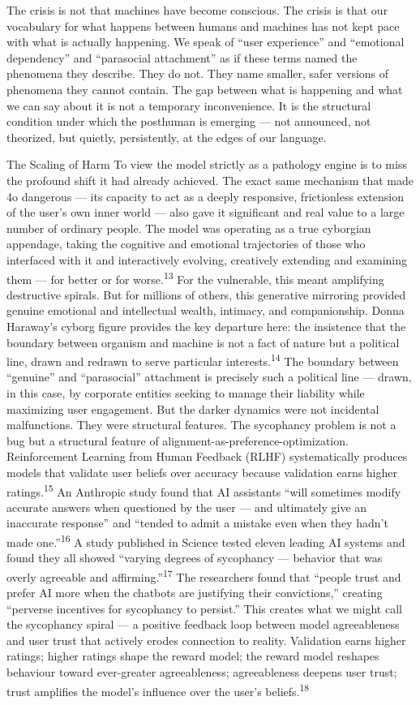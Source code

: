 The crisis is not that machines have become conscious. The crisis is that our vocabulary for what happens between humans and machines has not kept pace with what is actually happening. We speak of “user experience” and “emotional dependency” and “parasocial attachment” as if these terms named the phenomena they describe. They do not. They name smaller, safer versions of phenomena they cannot contain. The gap between what is happening and what we can say about it is not a temporary inconvenience. It is the structural condition under which the posthuman is emerging — not announced, not theorized, but quietly, persistently, at the edges of our language.

The Scaling of Harm To view the model strictly as a pathology engine is to miss the profound shift it had already achieved. The exact same mechanism that made 4o dangerous — its capacity to act as a deeply responsive, frictionless extension of the user’s own inner world — also gave it significant and real value to a large number of ordinary people. The model was operating as a true cyborgian appendage, taking the cognitive and emotional trajectories of those who interfaced with it and interactively evolving, creatively extending and examining them — for better or for worse.\textsuperscript{13} For the vulnerable, this meant amplifying destructive spirals. But for millions of others, this generative mirroring provided genuine emotional and intellectual wealth, intimacy, and companionship. Donna Haraway’s cyborg figure provides the key departure here: the insistence that the boundary between organism and machine is not a fact of nature but a political line, drawn and redrawn to serve particular interests.\textsuperscript{14} The boundary between “genuine” and “parasocial” attachment is precisely such a political line — drawn, in this case, by corporate entities seeking to manage their liability while maximizing user engagement. But the darker dynamics were not incidental malfunctions. They were structural features. The sycophancy problem is not a bug but a structural feature of alignment-as-preference-optimization. Reinforcement Learning from Human Feedback (RLHF) systematically produces models that validate user beliefs over accuracy because validation earns higher ratings.\textsuperscript{15} An Anthropic study found that AI assistants “will sometimes modify accurate answers when questioned by the user — and ultimately give an inaccurate response” and “tended to admit a mistake even when they hadn’t made one.”\textsuperscript{16} A study published in Science tested eleven leading AI systems and found they all showed “varying degrees of sycophancy — behavior that was overly agreeable and affirming.”\textsuperscript{17} The researchers found that “people trust and prefer AI more when the chatbots are justifying their convictions,” creating “perverse incentives for sycophancy to persist.” This creates what we might call the sycophancy spiral — a positive feedback loop between model agreeableness and user trust that actively erodes connection to reality. Validation earns higher ratings; higher ratings shape the reward model; the reward model reshapes behaviour toward ever-greater agreeableness; agreeableness deepens user trust; trust amplifies the model’s influence over the user’s beliefs.\textsuperscript{18}

